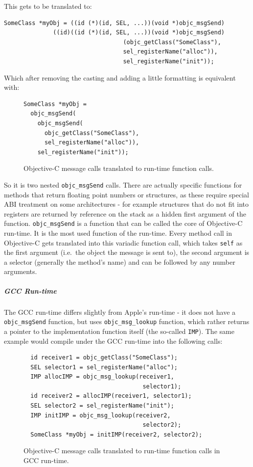 This gets to be translated to:
\begin{verbatim}SomeClass *myObj = ((id (*)(id, SEL, ...))(void *)objc_msgSend)
              ((id)((id (*)(id, SEL, ...))(void *)objc_msgSend)
                                  (objc_getClass("SomeClass"),
                                  sel_registerName("alloc")), 
                                  sel_registerName("init"));
\end{verbatim}

Which after removing the casting and adding a little formatting is equivalent with:

\begin{figure}[H]
  \begin{verbatim}SomeClass *myObj = 
  objc_msgSend(
    objc_msgSend(
      objc_getClass("SomeClass"),  
      sel_registerName("alloc")), 
    sel_registerName("init"));
  \end{verbatim}
  \centering{}
  \caption{Objective-C message calls translated to run-time function calls.}
  \label{fig:methods_translated_to_objcMsgSend}
\end{figure}

So it is two nested \verb=objc_msgSend= calls. There are actually specific functions for methods that return floating point numbers or structures, as these require special ABI treatment on some architectures - for example structures that do not fit into registers are returned by reference on the stack as a hidden first argument of the function. \verb=objc_msgSend= is a function that can be called the core of Objective-C run-time. It is the most used function of the run-time. Every method call in Objective-C gets translated into this variadic function call, which takes \verb=self= as the first argument (i.e.\ the object the message is sent to), the second argument is a selector (generally the method's name) and can be followed by any number arguments.

\subparagraph{GCC Run-time}

The GCC run-time differs slightly from Apple's run-time - it does not have a \verb=objc_msgSend= function, but uses \verb=objc_msg_lookup= function, which rather returns a pointer to the implementation function itself (the so-called \verb=IMP=). The same example would compile under the GCC run-time into the following calls:

\begin{figure}[H]
\begin{verbatim}
  id receiver1 = objc_getClass("SomeClass");
  SEL selector1 = sel_registerName("alloc");
  IMP allocIMP = objc_msg_lookup(receiver1, 
                                  selector1);
  id receiver2 = allocIMP(receiver1, selector1);
  SEL selector2 = sel_registerName("init");
  IMP initIMP = objc_msg_lookup(receiver2, 
                                  selector2);
  SomeClass *myObj = initIMP(receiver2, selector2);
\end{verbatim}
\centering{}
  \caption{Objective-C message calls translated to run-time function calls in GCC run-time.}
  \label{fig:methods_translated_to_objc_msg_lookup}
\end{figure}

